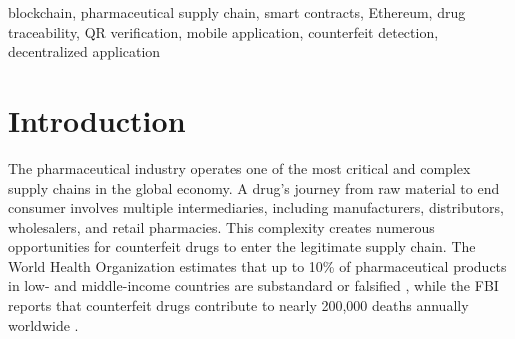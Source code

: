 \documentclass[conference]{IEEEtran}
\begin{document}
\begin{abstract}
The World Health Organization estimates that counterfeit medications cause almost 200,000 deaths annually, posing a major threat to public health globally. It is challenging to confirm drug authenticity at any stage of the distribution process because traditional supply chain systems are opaque and vulnerable to data manipulation. This paper introduces PharmaChain, a decentralized system for managing the pharmaceutical supply chain. It uses Ethereum smart contracts along with an off-chain PostgreSQL database to ensure complete drug
traceability.The system has a role-based access control model. This is enforced both on-chain through Solidity modifiers and off-chain using JWT authenticated API routes. It supports four roles: Manufacturer, Distributor, Wholesaler, and Admin.The four stages of a drug's lifecycle are manufacturing, distribution, wholesale, and sale. Every change is permanently documented on the blockchain. An auto-generated QR hash system allows consumers to check drug authenticity through a mobile app based on React.This app retrieves real time on-chain verification results by scanning QR codes.Next.js 16 and React 19 are used in the development of the web application. Ethers.js 6 is used to integrate MetaMask for wallet based authentication. Experimental results show that the system effectively prevents unauthorized stage transitions,detects expired and rejected drugs, and provides a complete
ownership history for any registered pharmaceutical product.
\end{abstract}

\begin{IEEEkeywords}
blockchain, pharmaceutical supply chain, smart contracts, Ethereum, drug traceability, QR verification, mobile application, counterfeit detection, decentralized application
\end{IEEEkeywords}

\section{Introduction}

The pharmaceutical industry operates one of the most critical and complex supply chains in the global economy. A drug's journey from raw material to end consumer involves multiple intermediaries, including manufacturers, distributors, wholesalers, and retail pharmacies. This complexity creates numerous opportunities for counterfeit drugs to enter the legitimate supply chain. The World Health Organization estimates that up to 10\% of pharmaceutical products in low- and middle-income countries are substandard or falsified \cite{b1}, while the FBI reports that counterfeit drugs contribute to nearly 200,000 deaths annually worldwide \cite{b2}.
\end{document}
